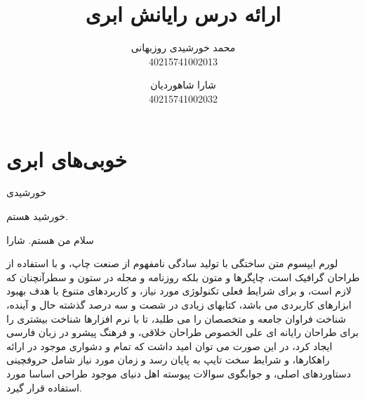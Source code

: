 \documentclass{book}
\title{ارائه درس رایانش ابری}
\author{محمد خورشیدی روزبهانی\\40215741002013 \and شارا شاهوردیان\\40215741002032}
\date{}
\begin{document}
    \maketitle

    \tableofcontents

    \newpage

    \chapter{خوبی‌های ابری}

    خورشیدی

    خورشید هستم.

    سلام من هستم. شارا 

    لورم ایپسوم متن ساختگی با تولید سادگی نامفهوم از صنعت چاپ، و با استفاده از طراحان گرافیک است، چاپگرها و متون بلکه روزنامه و مجله در ستون و سطرآنچنان که لازم است، و برای شرایط فعلی تکنولوژی مورد نیاز، و کاربردهای متنوع با هدف بهبود ابزارهای کاربردی می باشد، کتابهای زیادی در شصت و سه درصد گذشته حال و آینده، شناخت فراوان جامعه و متخصصان را می طلبد، تا با نرم افزارها شناخت بیشتری را برای طراحان رایانه ای علی الخصوص طراحان خلاقی، و فرهنگ پیشرو در زبان فارسی ایجاد کرد، در این صورت می توان امید داشت که تمام و دشواری موجود در ارائه راهکارها، و شرایط سخت تایپ به پایان رسد و زمان مورد نیاز شامل حروفچینی دستاوردهای اصلی، و جوابگوی سوالات پیوسته اهل دنیای موجود طراحی اساسا مورد استفاده قرار گیرد.
\end{document}
